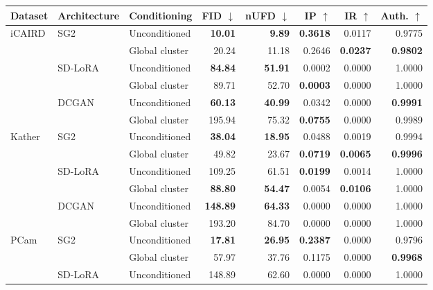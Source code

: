 \begin{table}[htbp]
\centering
\scriptsize
\setlength{\tabcolsep}{3.5pt}
\renewcommand{\arraystretch}{1.05}
\begin{tabular}{lllrrrrr}
\toprule
Dataset & Architecture & Conditioning & FID $\downarrow$ & nUFD $\downarrow$ & IP $\uparrow$ & IR $\uparrow$ & Auth. $\uparrow$ \\
\midrule
\multirow{6}{*}{iCAIRD} & \multirow{2}{*}{SG2} & Unconditioned & \textbf{10.01} & \textbf{9.89} & \textbf{0.3618} & 0.0117 & 0.9775 \\
 &  & Global cluster & 20.24 & 11.18 & 0.2646 & \textbf{0.0237} & \textbf{0.9802} \\
\cmidrule(lr){2-8}
 & \multirow{2}{*}{SD-LoRA} & Unconditioned & \textbf{84.84} & \textbf{51.91} & 0.0002 & 0.0000 & 1.0000 \\
 &  & Global cluster & 89.71 & 52.70 & \textbf{0.0003} & 0.0000 & 1.0000 \\
\cmidrule(lr){2-8}
 & \multirow{2}{*}{DCGAN} & Unconditioned & \textbf{60.13} & \textbf{40.99} & 0.0342 & 0.0000 & \textbf{0.9991} \\
 &  & Global cluster & 195.94 & 75.32 & \textbf{0.0755} & 0.0000 & 0.9989 \\
\midrule
\multirow{6}{*}{Kather} & \multirow{2}{*}{SG2} & Unconditioned & \textbf{38.04} & \textbf{18.95} & 0.0488 & 0.0019 & 0.9994 \\
 &  & Global cluster & 49.82 & 23.67 & \textbf{0.0719} & \textbf{0.0065} & \textbf{0.9996} \\
\cmidrule(lr){2-8}
 & \multirow{2}{*}{SD-LoRA} & Unconditioned & 109.25 & 61.51 & \textbf{0.0199} & 0.0014 & 1.0000 \\
 &  & Global cluster & \textbf{88.80} & \textbf{54.47} & 0.0054 & \textbf{0.0106} & 1.0000 \\
\cmidrule(lr){2-8}
 & \multirow{2}{*}{DCGAN} & Unconditioned & \textbf{148.89} & \textbf{64.33} & 0.0000 & 0.0000 & 1.0000 \\
 &  & Global cluster & 193.20 & 84.70 & 0.0000 & 0.0000 & 1.0000 \\
\midrule
\multirow{6}{*}{PCam} & \multirow{2}{*}{SG2} & Unconditioned & \textbf{17.81} & \textbf{26.95} & \textbf{0.2387} & 0.0000 & 0.9796 \\
 &  & Global cluster & 57.97 & 37.76 & 0.1175 & 0.0000 & \textbf{0.9968} \\
\cmidrule(lr){2-8}
 & \multirow{2}{*}{SD-LoRA} & Unconditioned & 148.89 & 62.60 & 0.0000 & 0.0000 & 1.0000 \\

\end{tabular}
\end{table}
